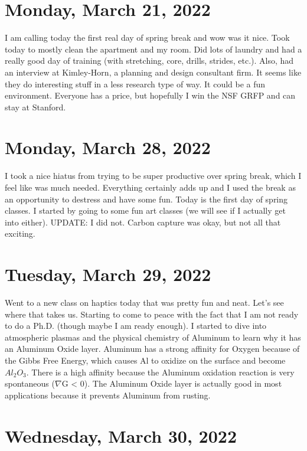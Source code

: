 \documentclass[12pt]{report}
\begin{document}
\section{Monday, March 21, 2022}

\par
I am calling today the first real day of spring break and wow was it nice. Took today to mostly clean the apartment and my room.  Did lots of laundry and had a really good day of training (with stretching, core, drills, strides, etc.). Also, had an interview at Kimley-Horn, a planning and design consultant firm. It seems like they do interesting stuff in a less research type of way. It could be a fun environment. Everyone has a price, but hopefully I win the NSF GRFP and can stay at Stanford. 

\section{Monday, March 28, 2022}

\par
I took a nice hiatus from trying to be super productive over spring break, which I feel like was much needed. Everything certainly adds up and I used the break as an opportunity to destress and have some fun. Today is the first day of spring classes.  I started by going to some fun art classes (we will see if I actually get into either). UPDATE: I did not. Carbon capture was okay, but not all that exciting.

\section{Tuesday, March 29, 2022}

\par
Went to a new class on haptics today that was pretty fun and neat. Let's see where that takes us. Starting to come to peace with the fact that I am not ready to do a Ph.D. (though maybe I am ready enough). I started to dive into atmospheric plasmas and the physical chemistry of Aluminum to learn why it has an Aluminum Oxide layer. Aluminum has a strong affinity for Oxygen because of the Gibbs Free Energy, which causes Al to oxidize on the surface and become $Al_2O_3$. There is a high affinity because the Aluminum oxidation reaction is very spontaneous ($\nabla$G < 0). The Aluminum Oxide layer is actually good in most applications because it prevents Aluminum from rusting. 

\section{Wednesday, March 30, 2022}
\end{document}
